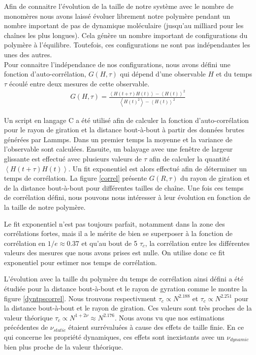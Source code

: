 \documentclass[a4paper,11pt]{article}
\begin{document}
Afin de connaitre l'évolution de la taille de notre système avec le nombre de monomères nous avons laissé évoluer librement notre polymère pendant un nombre important de pas de dynamique moléculaire (jusqu'au milliard pour les chaînes les plus longues). Cela génère un nombre important de configurations du polymère à l'équilibre. Toutefois, ces configurations ne sont pas indépendantes les unes des autres.\\

Pour connaitre l'indépendance de nos configurations, nous avons défini une fonction d'auto-corrélation, $G(H,\tau)$ qui dépend d'une observable $H$ et du temps $\tau$ écoulé entre deux mesures de cette observable.
\begin{eqnarray}
G(H,\tau)=\frac{\left<H(t+\tau)H(t)\right> -\left<H(t)\right>^2}{\left<H(t)^2\right> -\left<H(t)\right> ^2}
\end{eqnarray}

Un script en langage C a été utilisé afin de calculer la fonction d'auto-corrélation pour le rayon de giration et la distance bout-à-bout à partir des données brutes générées par Lammps. Dans un premier temps la moyenne et la variance de l'observable sont calculées. Ensuite, un balayage avec une fenêtre de largeur glissante est effectué avec plusieurs valeurs de $\tau$ afin de calculer la quantité $\left<H(t+\tau)H(t)\right>$. Un fit exponentiel est alors effectué afin de déterminer un temps de corrélation. La figure \ref{correl} présente $G(R,\tau)$ du rayon de giration et de la distance bout-à-bout pour différentes tailles de chaîne. Une fois ces temps de corrélation défini, nous pouvons nous intéresser à leur évolution en fonction de la taille de notre polymère.

Le fit exponentiel n'est pas toujours parfait, notamment dans la zone des corrélations fortes, mais il a le mérite de bien se superposer à la fonction de corrélation en $1/e \approx 0.37$ et qu'au bout de 5 $\tau_c$, la corrélation entre les différentes valeurs des mesures que nous avons prises est nulle. On utilise donc ce fit exponentiel pour estimer nos temps de corrélation. 

L'évolution avec la taille du polymère du temps de corrélation ainsi défini a été étudiée pour la distance bout-à-bout et le rayon de gyration comme le montre la figure \ref{dyntpscorrel}. Nous trouvons respectivment $\tau_c \propto N^{2.188}$ et $\tau_c \propto N^{2.251}$ pour la distance bout-à-bout et le rayon de giration. Ces valeurs sont très proches de la valeur théorique $\tau_c \propto N^{1+2\nu} \approx N^{2.176}$. Nous avons vu que nos estimations précédentes de $\nu_{static}$ étaient surrévaluées à cause des effets de taille finie. En ce qui concerne les propriété dynamiques, ces effets sont inexistants avec un $\nu_{dynamic}$ bien plus proche de la valeur théorique.
\end{document}
